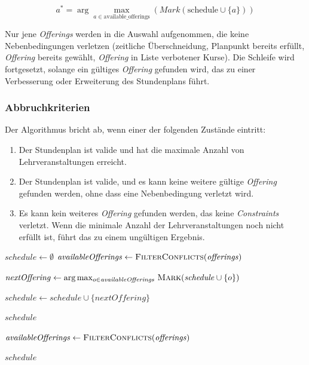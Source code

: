 \begin{equation}
    \label{eq:v1_selection}
    a^* = \arg\max_{a \in \text{available\_offerings}} \left( \textit{Mark}(\text{schedule} \cup \{a\}) \right)
\end{equation}


Nur jene \textit{Offerings} werden in die Auswahl aufgenommen, die keine Nebenbedingungen verletzen (zeitliche Überschneidung, Planpunkt bereits erfüllt, \textit{Offering} bereits gewählt, \textit{Offering} in Liste verbotener Kurse). Die Schleife wird fortgesetzt, solange ein gültiges \textit{Offering} gefunden wird, das zu einer Verbesserung oder Erweiterung des Stundenplans führt.





\subsubsection{Abbruchkriterien}
Der Algorithmus bricht ab, wenn einer der folgenden Zustände eintritt:
\begin{enumerate}
    \item Der Stundenplan ist valide und hat die maximale Anzahl von Lehrveranstaltungen erreicht.
    \item Der Stundenplan ist valide, und es kann keine weitere gültige \textit{Offering} gefunden werden, ohne dass eine Nebenbedingung verletzt wird.
    \item Es kann kein weiteres \textit{Offering} gefunden werden, das keine \textit{Constraints} verletzt. Wenn die minimale Anzahl der Lehrveranstaltungen noch nicht erfüllt ist, führt das zu einem ungültigen Ergebnis.
\end{enumerate}


\begin{algorithm}[H]
    \caption{Hill-Climbing}
    \begin{algorithmic}[1]

        \State $\mathit{schedule} \gets \emptyset$
        \State $\mathit{availableOfferings} \gets \textsc{FilterConflicts}(\mathit{offerings})$


        \State $\mathit{nextOffering} \gets \arg\max_{o \in \mathit{availableOfferings}} \, \textsc{Mark}(\mathit{schedule} \cup \{o\})$

        \State $\mathit{schedule} \gets \mathit{schedule} \cup \{\mathit{nextOffering}\}$
        \EndIf

        \State \Return $\mathit{schedule}$
        \EndIf

        \State $\mathit{availableOfferings} \gets \textsc{FilterConflicts}(\mathit{offerings})$

        \EndWhile

        \State \Return $\mathit{schedule}$

    \end{algorithmic}
\end{algorithm}





